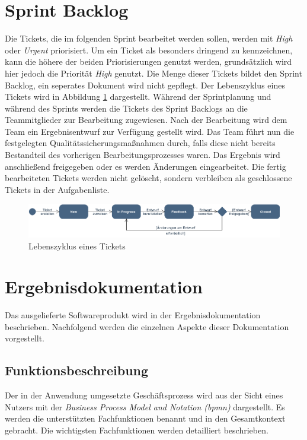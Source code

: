 \documentclass[a4paper,11pt,listof=numbered,glossary=totoc,parskip=half,toc=bib]{scrreprt}
\begin{document}
	\section{Sprint Backlog}
	Die Tickets, die im folgenden Sprint bearbeitet werden sollen, werden mit \textit{High} oder \textit{Urgent} priorisiert. Um ein Ticket als besonders dringend zu kennzeichnen, kann die höhere der beiden Priorisierungen genutzt werden, grundsätzlich wird hier jedoch die Priorität \textit{High} genutzt. Die Menge dieser Tickets bildet den Sprint Backlog, ein seperates Dokument wird nicht gepflegt. Der Lebenszyklus eines Tickets wird in Abbildung \ref{fig:ticketlebenszyklus} dargestellt. Während der Sprintplanung und während des Sprints werden die Tickets des Sprint Backlogs an die Teammitglieder zur Bearbeitung zugewiesen. Nach der Bearbeitung wird dem Team ein Ergebnisentwurf zur Verfügung gestellt wird. Das Team führt nun die festgelegten Qualitätssicherungsmaßnahmen durch, falls diese nicht bereits Bestandteil des vorherigen Bearbeitungsprozesses waren. Das Ergebnis wird anschließend freigegeben oder es werden Änderungen eingearbeitet. Die fertig bearbeiteten Tickets werden nicht gelöscht, sondern verbleiben als geschlossene Tickets in der Aufgabenliste.
	\begin{figure}
		\includegraphics[width=\textwidth]{Ticketlebenszyklus}
		\caption{Lebenszyklus eines Tickets}
		\label{fig:ticketlebenszyklus}
	\end{figure}
	
	
	\section{Ergebnisdokumentation}
	Das ausgelieferte Softwareprodukt wird in der Ergebnisdokumentation beschrieben. Nachfolgend werden die einzelnen Aspekte dieser Dokumentation vorgestellt.
	
	\subsection{Funktionsbeschreibung}
	Der in der Anwendung umgesetzte Geschäftsprozess wird aus der Sicht eines Nutzers mit der \textit{Business Process Model and Notation (\Gls{bpmn})} dargestellt. Es werden die unterstützten Fachfunktionen benannt und in den Gesamtkontext gebracht. Die wichtigsten Fachfunktionen werden detailliert beschrieben.
			
\end{document}
